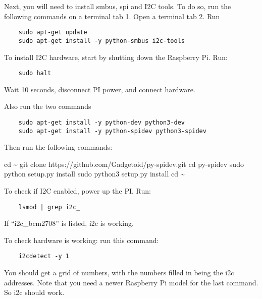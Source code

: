 \documentclass[
]{article}
\newenvironment{Shaded}{}{}
\newcommand{\BuiltInTok}[1]{#1}
\newcommand{\FunctionTok}[1]{\textcolor[rgb]{0.02,0.16,0.49}{#1}}
\newcommand{\NormalTok}[1]{#1}
\begin{document}
Next, you will need to install smbus, spi and I2C tools. To do so, run
the following commands on a terminal tab 1. Open a terminal tab 2. Run

\begin{verbatim}
    sudo apt-get update
    sudo apt-get install -y python-smbus i2c-tools
\end{verbatim}

To install I2C hardware, start by shutting down the Raspberry Pi. Run:

\begin{verbatim}
    sudo halt
\end{verbatim}

Wait 10 seconds, disconnect PI power, and connect hardware.

Also run the two commands

\begin{verbatim}
    sudo apt-get install -y python-dev python3-dev
    sudo apt-get install -y python-spidev python3-spidev
\end{verbatim}

Then run the following commands:

\begin{Shaded}
\begin{Highlighting}[]
\BuiltInTok{cd}\NormalTok{ \textasciitilde{}}
\FunctionTok{git}\NormalTok{ clone https://github.com/Gadgetoid/py{-}spidev.git}
\BuiltInTok{cd}\NormalTok{ py{-}spidev}
\FunctionTok{sudo}\NormalTok{ python setup.py install}
\FunctionTok{sudo}\NormalTok{ python3 setup.py install}
\BuiltInTok{cd}\NormalTok{ \textasciitilde{}}
\end{Highlighting}
\end{Shaded}

To check if I2C enabled, power up the PI. Run:

\begin{verbatim}
    lsmod | grep i2c_
\end{verbatim}

If ``i2c\_bcm2708'' is listed, i2c is working.

To check hardware is working: run this command:

\begin{verbatim}
    i2cdetect -y 1
\end{verbatim}

You should get a grid of numbers, with the numbers filled in being the
i2c addresses. Note that you need a newer Raspberry Pi model for the
last command. So i2c should work.
\end{document}
